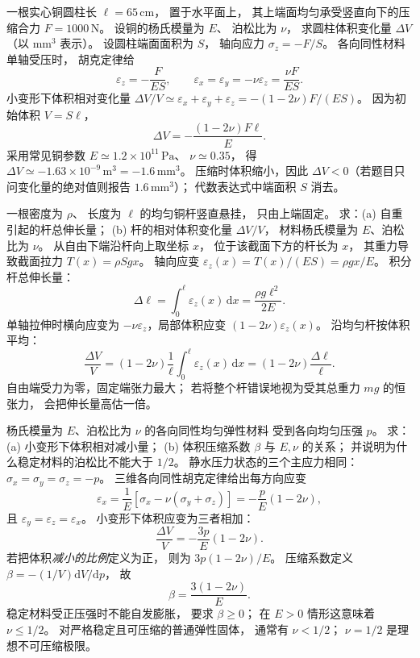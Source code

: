 一根实心铜圆柱长 $\ell=65\,\mathrm{cm}$，
置于水平面上，
其上端面均匀承受竖直向下的压缩合力
$F=1000\,\mathrm N$。
设铜的杨氏模量为 $E$、
泊松比为 $\nu$，
求圆柱体积变化量 $\Delta V$
（以 $\mathrm{mm^3}$ 表示）。
\exsolution
设圆柱端面面积为 $S$，
轴向应力 $\sigma_z=-F/S$。
各向同性材料单轴受压时，
胡克定律给
\[
\varepsilon_z=-\frac{F}{ES},\qquad
\varepsilon_x=\varepsilon_y=
-\nu\varepsilon_z=\frac{\nu F}{ES}.
\]
小变形下体积相对变化量
$\Delta V/V\simeq\varepsilon_x+\varepsilon_y+\varepsilon_z
=-(1-2\nu)F/(ES)$。
因为初始体积 $V=S\ell$，
\[
\boxed{\Delta V=-\frac{(1-2\nu)F\ell}{E}}.
\]
采用常见铜参数
$E\simeq1.2\times10^{11}\,\mathrm{Pa}$、
$\nu\simeq0.35$，
得
$\Delta V\simeq-1.63\times10^{-9}\,\mathrm{m^3}
=\boxed{-1.6\,\mathrm{mm^3}}$。
\excheck 压缩时体积缩小，因此
$\Delta V<0$（若题目只问变化量的绝对值则报告
$1.6\,\mathrm{mm^3}$）；
代数表达式中端面积 $S$ 消去。

一根密度为 $\rho$、
长度为 $\ell$ 的均匀铜杆竖直悬挂，
只由上端固定。
求：(a) 自重引起的杆总伸长量；
(b) 杆的相对体积变化量 $\Delta V/V$，
材料杨氏模量为 $E$、泊松比为 $\nu$。
\exsolution
从自由下端沿杆向上取坐标 $x$，
位于该截面下方的杆长为 $x$，
其重力导致截面拉力
$T(x)=\rho S g x$。
轴向应变
$\varepsilon_z(x)=T(x)/(ES)=\rho gx/E$。
积分杆总伸长量：
\[
\boxed{\Delta\ell=
\int_0^\ell\varepsilon_z(x)\,\mathrm dx
=\frac{\rho g\ell^2}{2E}}.
\]
单轴拉伸时横向应变为
$-\nu\varepsilon_z$，局部体积应变
$(1-2\nu)\varepsilon_z(x)$。
沿均匀杆按体积平均：
\[
\boxed{\frac{\Delta V}{V}
=(1-2\nu)\frac1\ell
\int_0^\ell\varepsilon_z(x)\,\mathrm dx
=(1-2\nu)\frac{\Delta\ell}{\ell}}.
\]
\excheck 自由端受力为零，固定端张力最大；
若将整个杆错误地视为受其总重力 $mg$ 的恒张力，
会把伸长量高估一倍。

杨氏模量为 $E$、泊松比为 $\nu$ 的各向同性均匀弹性材料
受到各向均匀压强 $p$。
求：(a) 小变形下体积相对减小量；
(b) 体积压缩系数 $\beta$ 与
$E,\nu$ 的关系；
并说明为什么稳定材料的泊松比不能大于 $1/2$。
\exsolution
静水压力状态的三个主应力相同：
$\sigma_x=\sigma_y=\sigma_z=-p$。
三维各向同性胡克定律给出每方向应变
\[
\varepsilon_x=
\frac1E[\sigma_x-\nu(\sigma_y+\sigma_z)]
=-\frac{p}{E}(1-2\nu),
\]
且 $\varepsilon_y=\varepsilon_z=\varepsilon_x$。
小变形下体积应变为三者相加：
\[
\boxed{\frac{\Delta V}{V}
=-\frac{3p}{E}(1-2\nu)}.
\]
若把体积\emph{减小的比例}定义为正，
则为 $3p(1-2\nu)/E$。
压缩系数定义
$\beta=-(1/V)\mathrm dV/\mathrm dp$，
故
\[
\boxed{\beta=\frac{3(1-2\nu)}{E}}.
\]
稳定材料受正压强时不能自发膨胀，
要求 $\beta\ge0$；
在 $E>0$ 情形这意味着
$\boxed{\nu\le1/2}$。
\excheck 对严格稳定且可压缩的普通弹性固体，
通常有 $\nu<1/2$；
$\nu=1/2$ 是理想不可压缩极限。

